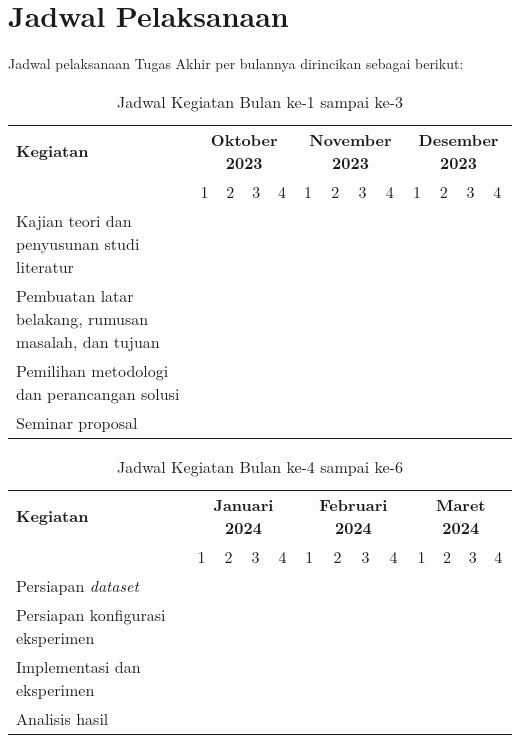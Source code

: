 \newpage
\section{Jadwal Pelaksanaan}
Jadwal pelaksanaan Tugas Akhir per bulannya dirincikan sebagai berikut:

\begin{table}[ht]
\caption{Jadwal Kegiatan Bulan ke-1 sampai ke-3}
\begin{tabular}{|m{4cm}|*{12}{m{0.4cm}|}}
\hline
\rowcolor{lightgray} %
\textbf{Kegiatan} & \multicolumn{4}{c|}{\textbf{Oktober 2023}} & \multicolumn{4}{c|}{\textbf{November 2023}} & \multicolumn{4}{c|}{\textbf{Desember 2023}} \\
\cline{2-13}
\cellcolor{lightgray} & 1 & 2 & 3 & 4 & 1 & 2 & 3 & 4 & 1 & 2 & 3 & 4 \\
\hline
Kajian teori dan penyusunan studi literatur & \cellcolor{blue!25} & \cellcolor{blue!25} & \cellcolor{blue!25} & & & & & & & & & \\
\hline
Pembuatan latar belakang, rumusan masalah, dan tujuan & & & & \cellcolor{blue!25} & \cellcolor{blue!25} & \cellcolor{blue!25} & \cellcolor{blue!25} & & & & & \\
\hline
Pemilihan metodologi dan perancangan solusi & & & & & & & & \cellcolor{blue!25} & \cellcolor{blue!25} & \cellcolor{blue!25} & & \\
\hline
Seminar proposal & & & & & & & & & & & \cellcolor{blue!25} & \cellcolor{blue!25} \\
\hline
\end{tabular}
\end{table}

\begin{table}[ht]
\caption{Jadwal Kegiatan Bulan ke-4 sampai ke-6}
\begin{tabular}{|m{4cm}|*{12}{m{0.4cm}|}}
\hline
\rowcolor{lightgray} %
\textbf{Kegiatan} & \multicolumn{4}{c|}{\textbf{Januari 2024}} & \multicolumn{4}{c|}{\textbf{Februari 2024}} & \multicolumn{4}{c|}{\textbf{Maret 2024}} \\
\cline{2-13}
\cellcolor{lightgray} & 1 & 2 & 3 & 4 & 1 & 2 & 3 & 4 & 1 & 2 & 3 & 4 \\
\hline
Persiapan \textit{dataset} & \cellcolor{blue!25} & \cellcolor{blue!25} & & & & & & & & & & \\
\hline
Persiapan konfigurasi eksperimen & & & \cellcolor{blue!25} & \cellcolor{blue!25} & & & & & & & & \\
\hline
Implementasi dan eksperimen & & & & & \cellcolor{blue!25} &\cellcolor{blue!25}  & \cellcolor{blue!25}& \cellcolor{blue!25} & \cellcolor{blue!25} & & & \\
\hline
Analisis hasil & & & & & & & & & & \cellcolor{blue!25} & \cellcolor{blue!25} & \cellcolor{blue!25} \\
\hline
\end{tabular}
\end{table}

